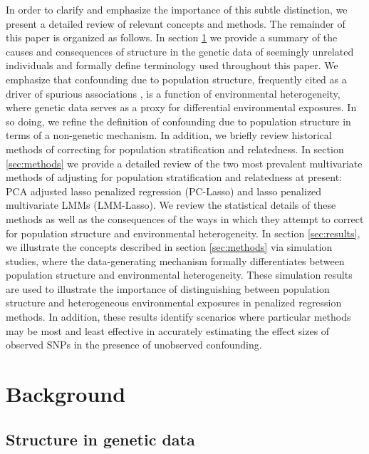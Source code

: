In order to clarify and emphasize the importance of this subtle distinction, we present a detailed review of relevant concepts and methods. The remainder of this paper is organized as follows. In section \ref{sec:background} we provide a summary of the causes and consequences of structure in the genetic data of seemingly unrelated individuals and formally define terminology used throughout this paper. We emphasize that confounding due to population structure, frequently cited as a driver of spurious associations \cite{Sillanpaeae2011, sul2018population}, is a function of environmental heterogeneity, where genetic data serves as a proxy for differential environmental exposures. In so doing, we refine the definition of confounding due to population structure in terms of a non-genetic mechanism. In addition, we briefly review historical methods of correcting for population stratification and relatedness. In section \ref{sec:methods} we provide a detailed review of the two most prevalent multivariate methods of adjusting for population stratification and relatedness at present: PCA adjusted lasso penalized regression (PC-Lasso) and lasso penalized multivariate LMMs (LMM-Lasso). We review the statistical details of these methods as well as the consequences of the ways in which they attempt to correct for population structure and environmental heterogeneity. In section \ref{sec:results}, we illustrate the concepts described in section \ref{sec:methods} via simulation studies, where the data-generating mechanism formally differentiates between population structure and environmental heterogeneity. These simulation results are used to illustrate the importance of distinguishing between population structure and heterogeneous environmental exposures in penalized regression methods. In addition, these results identify scenarios where particular methods may be most and least effective in accurately estimating the effect sizes of observed SNPs in the presence of unobserved confounding.




\section{Background} \label{sec:background}

\subsection{Structure in genetic data}

